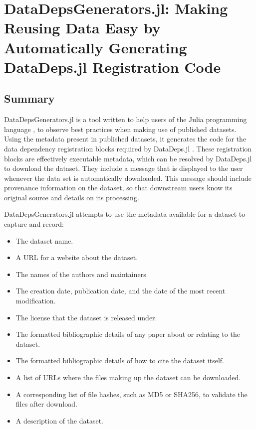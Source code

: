 \documentclass{book}
\begin{document}
\chapter{DataDepsGenerators.jl: Making Reusing Data Easy by Automatically Generating DataDeps.jl Registration Code}


\section{Summary}

DataDepsGenerators.jl is a tool written to help users of the Julia
programming language \citep{Julia}, to observe best practices when
making use of published datasets. Using the metadata present in
published datasets, it generates the code for the data dependency
registration blocks required by DataDeps.jl
\citep{2018arXiv180801091W}. These registration blocks are effectively
executable metadata, which can be resolved by DataDeps.jl to download
the dataset. They include a message that is displayed to the user
whenever the data set is automatically downloaded. This message should
include provenance information on the dataset, so that downstream users
know its original source and details on its processing.

DataDepsGenerators.jl attempts to use the metadata available for a
dataset to capture and record:

\begin{itemize}
	
	\item
	The dataset name.
	\item
	A URL for a website about the dataset.
	\item
	The names of the authors and maintainers
	\item
	The creation date, publication date, and the date of the most recent
	modification.
	\item
	The license that the dataset is released under.
	\item
	The formatted bibliographic details of any paper about or relating to
	the dataset.
	\item
	The formatted bibliographic details of how to cite the dataset itself.
	\item
	A list of URLs where the files making up the dataset can be
	downloaded.
	\item
	A corresponding list of file hashes, such as MD5 or SHA256, to
	validate the files after download.
	\item
	A description of the dataset.
\end{itemize}
\end{document}
